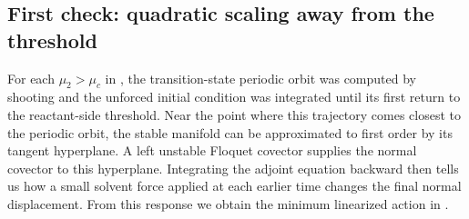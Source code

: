 \documentclass[11pt]{article}
\theoremstyle{definition}
\theoremstyle{remark}
\begin{document}
\subsection{First check: quadratic scaling away from the threshold}

For each $\mu_2>\mu_c$ in , the transition-state periodic orbit was computed by shooting and the unforced initial condition was integrated until its first return to the reactant-side threshold.  Near the point where this trajectory comes closest to the periodic orbit, the stable manifold can be approximated to first order by its tangent hyperplane.  A left unstable Floquet covector supplies the normal covector to this hyperplane.  Integrating the adjoint equation backward then tells us how a small solvent force applied at each earlier time changes the final normal displacement.  From this response we obtain the minimum linearized action in .
\end{document}
